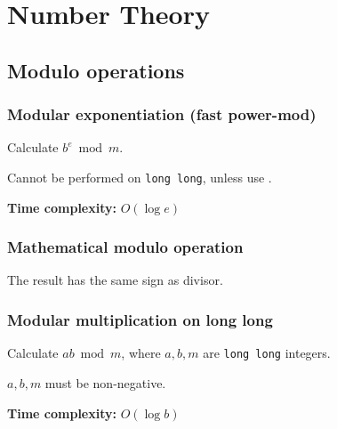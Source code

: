 
\newcommand{\BookNo}{2}
\newcommand{\BookTitle}{Number Theory \\[0.2cm] Linear Algebra \\[0.4cm] Combinatorics}


\setmainfont{Times New Roman}
\setlength{\parskip}{0.0in}
\tableofcontents
\setlength{\parskip}{0.1in}
\newevenpage
\section{Number Theory}
\subsection{Modulo operations}
\subsubsection{Modular exponentiation (fast power-mod)} \label{powmod}
Calculate $b^e \bmod m$. \par
\Warning Cannot be performed on \lstinline|long long|, unless use . \par
\textbf{Time complexity:} $O(\log e)$ \par


\subsubsection{Mathematical modulo operation}
The result has the same sign as divisor. \par


\subsubsection{Modular multiplication on long long} \label{mulmod}
Calculate $ab \bmod m$, where $a, b, m$ are \lstinline|long long| integers. \par
\Warning $a, b, m$ must be non-negative. \par
\textbf{Time complexity:} $O(\log b)$ \par


